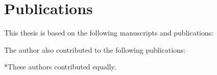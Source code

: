 \chapter*{Publications}

This thesis is based on the following manuscripts and publications:



\nocite{braemerPairLocalizationDipolar2022, franzObservationAnisotropyindependentMagnetization2024, franzEmergentPairLocalization2022,braemerClusterTruncatedWigner2024,eulerMetronomeSpinStabilizes2024} %
\printbibliography[heading=none, keyword={thesis-main}]
The author also contributed to the following publications:

\nocite{geierTimereversalDipolarQuantum2024,muellenbachOTOC,erpeldingSymmetries} 
\printbibliography[heading=none, keyword={thesis-additional}]

*These authors contributed equally.


%
